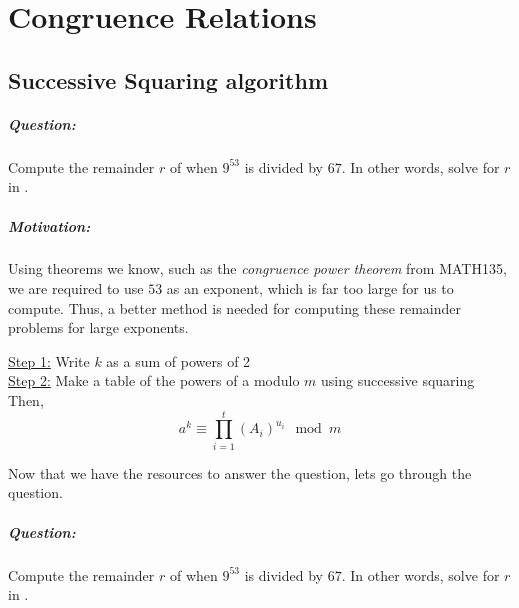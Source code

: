\documentclass[../main.tex]{subfiles}
\begin{document}
\chapter{Congruence Relations}

\section{Successive Squaring algorithm}
\paragraph{Question:}
Compute the remainder $r$ of when $9^{53}$ is divided by $67$. In other words, solve for $r$ in .
\paragraph{Motivation:}
Using theorems we know, such as the \textit{congruence power theorem} from MATH135, we are required to use $53$ as an exponent, which is far too large for us to compute. Thus, a better method is needed for computing these remainder problems for large exponents.
\begin{thm}
    \underline{Step 1:} Write $k$ as a sum of powers of 2 \\
    \underline{Step 2:} Make a table of the powers of a modulo $m$ using successive squaring \\
    Then, $$a^k \equiv \prod_{i=1}^{t} (A_i)^{u_i} \mod{m}$$
\end{thm}

Now that we have the resources to answer the question, lets go through the question.
\paragraph{Question:}
Compute the remainder $r$ of when $9^{53}$ is divided by $67$. In other words, solve for $r$ in .
\end{document}
